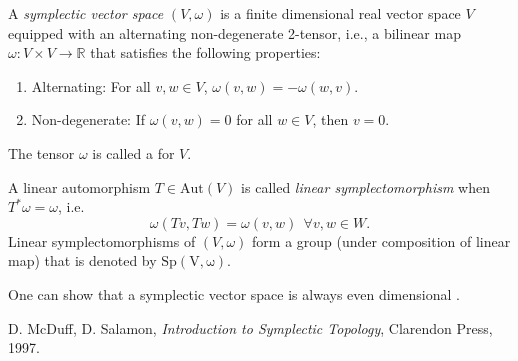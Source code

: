 \documentclass[12pt]{article}
\begin{document}
A \emph{symplectic vector space} $(V,\omega)$ 
is a finite dimensional real vector space $V$ equipped with
an alternating non-degenerate 2-tensor, i.e.,
a bilinear map $\omega\colon V\times V\rightarrow\mathbb R$ 
that satisfies the following properties:
\begin{enumerate}
\item Alternating: For all $v,w\in V$, $\omega(v,w)=-\omega(w,v)$.
\item Non-degenerate: If  $\omega(v,w)=0$ for all $w\in V$, then $v=0$.
\end{enumerate}
The tensor $\omega$ is
called a  for $V$.

A linear automorphism $T\in\mathrm{Aut}(V)$ is called \emph{linear symplectomorphism} when $T^*\omega=\omega$, i.e. $$ \omega(Tv,Tw)=\omega(v,w)\ \ \forall v,w\in W.$$
Linear symplectomorphisms of $(V,\omega)$ form a group (under composition of linear map) that is denoted by $\mathrm{Sp(V,\omega)}$.

One can show that a symplectic vector space is always even dimensional \cite{duff}.

\begin{thebibliography}{9}
 D. McDuff, D. Salamon,
        \emph{Introduction to Symplectic Topology},
        Clarendon Press, 1997.
\end{thebibliography}
\end{document}
